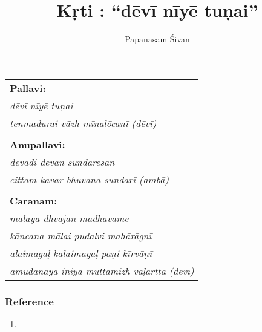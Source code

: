 




\title{K\d rti : ``d\=ev\=i n\=iy\=e tu\d{n}ai''}
\author{P\=apan\=asam \'Sivan}


\maketitle


\vspace{0.25 in}

%
%
%
%
%


\begin{tabular}{l}
\textbf{Pallavi:}\\
\emph{d\=ev\=i n\=iy\=e tu\d{n}ai}\\
\emph{tenmadurai v\=azh m\=inal\=ocan\=i (d\=ev\=i)}\\
\\
\textbf{Anupallavi:}\\
\emph{d\=ev\=adi d\=evan sundar\=esan}\\
\emph{cittam kavar bhuvana sundar\=i (amb\=a)}\\
\\
\textbf{Caranam:}\\
\emph{malaya dhvajan m\=adhavam\=e}\\
\emph{k\=ancana m\=alai pudalvi mah\=ar\=agn\=i}\\
\emph{alaimaga\d{l} kalaimaga\d{l} pa\d{n}i k\=irv\=a\d{n}\=i}\\
\emph{amudanaya iniya muttamizh va\d{l}artta (d\=ev\=i)}
\end{tabular}

\subsubsection*{Reference}

\begin{enumerate}
\item {}
\end{enumerate}

  
